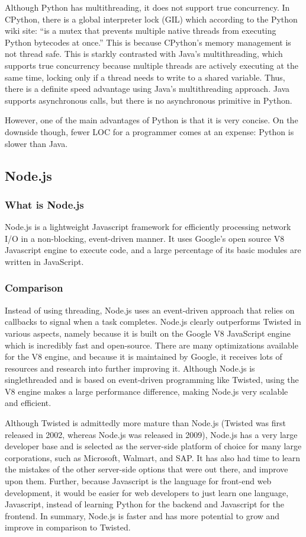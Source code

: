 \documentclass[letterpaper,twocolumn,10pt]{article}
\begin{document}
Although Python has multithreading, it does not support true concurrency. In CPython, there is a global interpreter lock (GIL) which according to the Python wiki site: “is a mutex that prevents multiple native threads from executing Python bytecodes at once.” This is because CPython’s memory management is not thread safe. This is starkly contrasted with Java’s multithreading, which supports true concurrency because multiple threads are actively executing at the same time, locking only if a thread needs to write to a shared variable. Thus, there is a definite speed advantage using Java’s multithreading approach. Java supports asynchronous calls, but there is no asynchronous primitive in Python. 

However, one of the main advantages of Python is that it is very concise. On the downside though, fewer LOC for a programmer comes at an expense: Python is slower than Java. 	

\subsection{Node.js}
\subsubsection{What is Node.js}
Node.js is a lightweight Javascript framework for efficiently processing network I/O in a non-blocking, event-driven manner. It uses Google’s open source V8 Javascript engine to execute code, and a large percentage of its basic modules are written in JavaScript.

\subsubsection{Comparison}
Instead of using threading, Node.js uses an event-driven approach that relies on callbacks to signal when a task completes. Node.js clearly outperforms Twisted in various aspects, namely because it is built on the Google V8 JavaScript engine which is incredibly fast and open-source. There are many optimizations available for the V8 engine, and because it is maintained by Google, it receives lots of resources and research into further improving it. Although Node.js is singlethreaded and is based on event-driven programming like Twisted, using the V8 engine makes a large performance difference, making Node.js very scalable and efficient.

Although Twisted is admittedly more mature than Node.js (Twisted was first released in 2002, whereas Node.js was released in 2009), Node.js has a very large developer base and is selected as the server-side platform of choice for many large corporations, such as Microsoft, Walmart, and SAP. It has also had time to learn the mistakes of the other server-side options that were out there, and improve upon them. Further, because Javascript is the language for front-end web development, it would be easier for web developers to just learn one language, Javascript, instead of learning Python for the backend and Javascript for the frontend. In summary, Node.js is faster and has more potential to grow and improve in comparison to Twisted.
\end{document}
